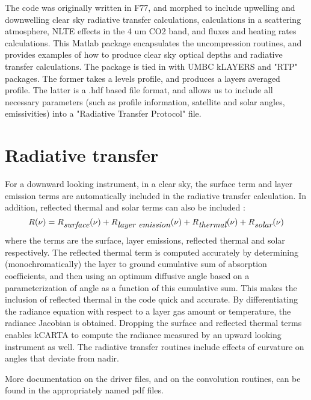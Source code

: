 \documentclass[12pt]{article}
\newcommand{\kc}{\textsf{kCARTA}\xspace}
\newcommand{\kl}{\textsf{kLAYERS}\xspace}
\begin{document}
The code was originally written in F77, and morphed to include upwelling and
downwelling clear sky radiative transfer calculations, calculations in a 
scattering atmosphere, NLTE effects in the 4 um CO2 band, and fluxes and
heating rates calculations. This Matlab package encapsulates the uncompression
routines, and provides examples of how to produce clear sky optical depths 
and radiative transfer calculations. The package is tied in with UMBC 
\kl and "RTP" packages. The former takes a levels profile, and produces 
a layers averaged profile. The latter is a .hdf based file format, and allows 
us to include all necessary parameters (such as profile information, satellite
and solar angles, emissivities) into a "Radiative Transfer Protocol" file.

\section{Radiative transfer}
For a downward looking instrument, in a clear sky, 
the surface term and layer emission terms are automatically included in the 
radiative transfer calculation.  In addition, reflected thermal and solar 
terms can also be included  :
\begin{equation}
R(\nu) = R_{\hbox{\it surface}}(\nu) + R_{\hbox{\it layer emission}}(\nu) + 
R_{\hbox{\it thermal}}(\nu) + R_{\hbox{\it solar}}(\nu)
\end{equation}
where the terms are the surface, layer emissions, reflected thermal
and solar respectively.  The reflected thermal term is computed
accurately by determining (monochromatically) the layer to ground
cumulative sum of absorption coefficients, and then using an optimum
diffusive angle based on a parameterization of angle as a function of
this cumulative sum.  This makes the inclusion of reflected thermal in
the code quick and accurate.   By differentiating the radiance equation
with respect to a layer gas amount or temperature, the radiance
Jacobian is obtained.  Dropping the surface and reflected thermal terms
enables \kc to compute the radiance measured by an upward looking
instrument as well. The radiative transfer routines include effects of
curvature on angles that deviate from nadir.

More documentation on the driver files, and on the convolution routines, 
can be found in the appropriately named pdf files.
\end{document}
